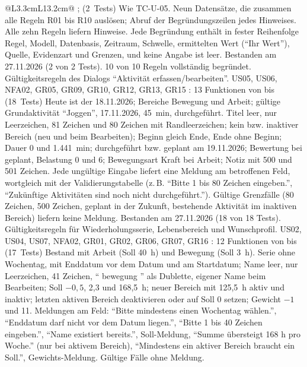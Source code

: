 \begin{longtable}{@{}L{3.3cm}L{13.2cm}@{}}
    {;  (2~Tests)}
    {Wie TC-U-05.}
    {Neun Datensätze, die zusammen alle Regeln R01 bis R10 auslösen; Abruf der Begründungszeilen jedes Hinweises.}
    {Alle zehn Regeln liefern Hinweise. Jede Begründung enthält in fester Reihenfolge Regel, Modell, Datenbasis, Zeitraum, Schwelle, ermittelten Wert (\enquote{Ihr Wert}), Quelle, Evidenzart und Grenzen, und keine Angabe ist leer.}
    {Bestanden am 27.11.2026 (2 von 2 Tests). 10 von 10 Regeln vollständig begründet.}
  \midrule
    {Gültigkeitsregeln des Dialogs \enquote{Aktivität erfassen/bearbeiten}.}
    {US05, US06, NFA02, GR05, GR09, GR10, GR12, GR13, GR15}
    {: 13 Funktionen von  bis  (18~Tests)}
    {Heute ist der 18.11.2026; Bereiche Bewegung und Arbeit; gültige Grundaktivität \enquote{Joggen}, 17.11.2026, 45~min, durchgeführt.}
    {Titel leer, nur Leerzeichen, 81 Zeichen und 80 Zeichen mit Randleerzeichen; kein bzw. inaktiver Bereich (neu und beim Bearbeiten); Beginn gleich Ende, Ende ohne Beginn; Dauer 0 und 1.441~min; durchgeführt bzw. geplant am 19.11.2026; Bewertung bei geplant, Belastung 0 und 6; Bewegungsart Kraft bei Arbeit; Notiz mit 500 und 501 Zeichen.}
    {Jede ungültige Eingabe liefert eine Meldung am betroffenen Feld, wortgleich mit der Validierungstabelle (z.\,B. \enquote{Bitte 1 bis 80 Zeichen eingeben.}, \enquote{Zukünftige Aktivitäten sind noch nicht durchgeführt.}). Gültige Grenzfälle (80 Zeichen, 500 Zeichen, geplant in der Zukunft, bestehende Aktivität im inaktiven Bereich) liefern keine Meldung.}
    {Bestanden am 27.11.2026 (18 von 18 Tests).}
  \midrule
    {Gültigkeitsregeln für Wiederholungsserie, Lebensbereich und Wunschprofil.}
    {US02, US04, US07, NFA02, GR01, GR02, GR06, GR07, GR16}
    {: 12 Funktionen von  bis  (17~Tests)}
    {Bestand mit Arbeit (Soll 40~h) und Bewegung (Soll 3~h).}
    {Serie ohne Wochentag, mit Enddatum vor dem Datum und am Startdatum; Name leer, nur Leerzeichen, 41 Zeichen, \enquote{ bewegung } als Dublette, eigener Name beim Bearbeiten; Soll $-0{,}5$, 2,3 und 168,5~h; neuer Bereich mit 125,5~h aktiv und inaktiv; letzten aktiven Bereich deaktivieren oder auf Soll 0 setzen; Gewicht $-1$ und 11.}
    {Meldungen am Feld: \enquote{Bitte mindestens einen Wochentag wählen.}, \enquote{Enddatum darf nicht vor dem Datum liegen.}, \enquote{Bitte 1 bis 40 Zeichen eingeben.}, \enquote{Name existiert bereits.}, Soll-Meldung, \enquote{Summe übersteigt 168 h pro Woche.} (nur bei aktivem Bereich), \enquote{Mindestens ein aktiver Bereich braucht ein Soll.}, Gewichts-Meldung. Gültige Fälle ohne Meldung.}

\end{longtable}
